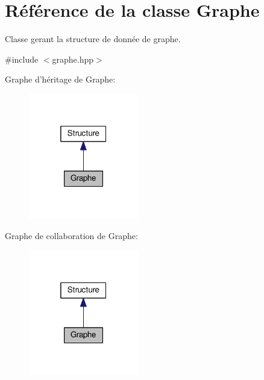 \hypertarget{classGraphe}{\section{Référence de la classe Graphe}
\label{classGraphe}
}


Classe gerant la structure de donnée de graphe.  




{\ttfamily \#include $<$graphe.\+hpp$>$}



Graphe d'héritage de Graphe\+:\nopagebreak
\begin{figure}[H]
\begin{center}
\leavevmode
\includegraphics[width=136pt]{classGraphe__inherit__graph}
\end{center}
\end{figure}


Graphe de collaboration de Graphe\+:\nopagebreak
\begin{figure}[H]
\begin{center}
\leavevmode
\includegraphics[width=136pt]{classGraphe__coll__graph}
\end{center}
\end{figure}
